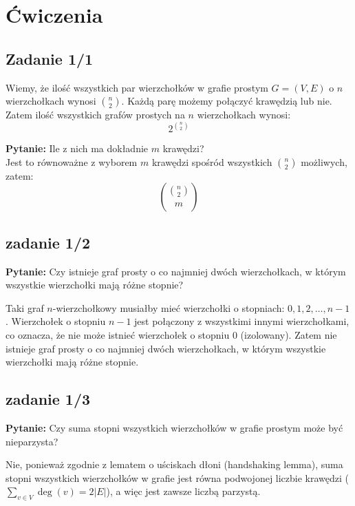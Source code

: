 \documentclass{article}
\begin{document}
\section*{Ćwiczenia}

\subsection*{Zadanie 1/1}

Wiemy, że ilość wszystkich par wierzchołków w grafie prostym $G = (V, E)$ o $n$ wierzchołkach wynosi $\binom{n}{2}$.
Każdą parę możemy połączyć krawędzią lub nie.
Zatem ilość wszystkich grafów prostych na $n$ wierzchołkach wynosi:
\[
2^{\binom{n}{2}}
\]

\textbf{Pytanie:} Ile z nich ma dokładnie $m$ krawędzi? \\
Jest to równoważne z wyborem $m$ krawędzi spośród wszystkich $\binom{n}{2}$ możliwych, zatem:
\[
\binom{\binom{n}{2}}{m}
\]

\subsection*{zadanie 1/2}
\textbf{Pytanie:} Czy istnieje graf prosty o co najmniej dwóch wierzchołkach, w którym wszystkie wierzchołki mają różne stopnie?

Taki graf $n$-wierzchołkowy musiałby mieć wierzchołki o stopniach: $0, 1, 2, \dots, n-1$.
Wierzchołek o stopniu $n-1$ jest połączony z wszystkimi innymi wierzchołkami, co oznacza, że nie może istnieć wierzchołek o stopniu 0 (izolowany).
Zatem nie istnieje graf prosty o co najmniej dwóch wierzchołkach, w którym wszystkie wierzchołki mają różne stopnie.

\subsection*{zadanie 1/3}
\textbf{Pytanie:} Czy suma stopni wszystkich wierzchołków w grafie prostym może być nieparzysta?

Nie, ponieważ zgodnie z lematem o uściskach dłoni (handshaking lemma), suma stopni wszystkich wierzchołków w grafie jest równa podwojonej liczbie krawędzi ($ \sum_{v \in V} \deg(v) = 2|E| $), a więc jest zawsze liczbą parzystą.
\end{document}
